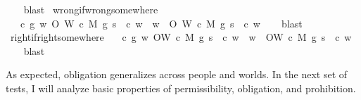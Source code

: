 \begin{isabellebody}
%
\isadelimproof
\ \ %
\endisadelimproof
%
\isatagproof
{}\isamarkupfalse%
\ blast%
\endisatagproof
{\isafoldproof}%
%
\isadelimproof
\isanewline
%
\endisadelimproof
\isanewline
{}\isamarkupfalse%
\ wrong{\isacharunderscore}if{\isacharunderscore}wrong{\isacharunderscore}somewhere{\isacharcolon}\isanewline
\ \ \ {\isachardoublequoteopen}{\isasymforall}c\ g{\isachardot}\ {\isasymexists}w{}{\isachardot}\ O{\isacharbraceleft}\isactrlbold {\isasymnot}\ {\isacharparenleft}W\ {\isacharparenleft}c{\isacharcomma}\ M{\isacharcomma}\ g{\isacharparenright}\ s{\isacharparenright}\ {\isacharbar}\ c{\isacharbraceright}\ w{}\ {\isasymlongrightarrow}\ {\isacharparenleft}{\isasymforall}w{}{\isachardot}\ \ O{\isacharbraceleft}\isactrlbold {\isasymnot}\ {\isacharparenleft}W\ {\isacharparenleft}c{\isacharcomma}\ M{\isacharcomma}\ g{\isacharparenright}\ s{\isacharparenright}\ {\isacharbar}\ c{\isacharbraceright}\ w{}{\isacharparenright}{\isachardoublequoteclose}\isanewline
%
\isadelimproof
\ \ %
\endisadelimproof
%
\isatagproof
{}\isamarkupfalse%
\ blast%
\endisatagproof
{\isafoldproof}%
%
\isadelimproof
\isanewline
%
\endisadelimproof
\isanewline
{}\isamarkupfalse%
\ right{\isacharunderscore}if{\isacharunderscore}right{\isacharunderscore}somewhere{\isacharcolon}\isanewline
\ \ \ {\isachardoublequoteopen}{\isasymforall}c\ g{\isachardot}\ {\isasymexists}w{}{\isachardot}\ O{\isacharbraceleft}W\ {\isacharparenleft}c{\isacharcomma}\ M{\isacharcomma}\ g{\isacharparenright}\ s\ {\isacharbar}\ c{\isacharbraceright}\ w{}\ {\isasymlongrightarrow}\ {\isacharparenleft}{\isasymforall}w{}{\isachardot}\ \ O{\isacharbraceleft}W\ {\isacharparenleft}c{\isacharcomma}\ M{\isacharcomma}\ g{\isacharparenright}\ s\ {\isacharbar}\ c{\isacharbraceright}\ w{}{\isacharparenright}{\isachardoublequoteclose}\isanewline
%
\isadelimproof
\ \ %
\endisadelimproof
%
\isatagproof
{}\isamarkupfalse%
\ blast%
\endisatagproof
{\isafoldproof}%
%
\isadelimproof
%
\endisadelimproof
%
\begin{isamarkuptext}%
As expected, obligation generalizes across people and worlds. In the next set of tests, I will 
analyze basic properties of permissibility, obligation, and prohibition. 


\end{isamarkuptext}
\end{isabellebody}
